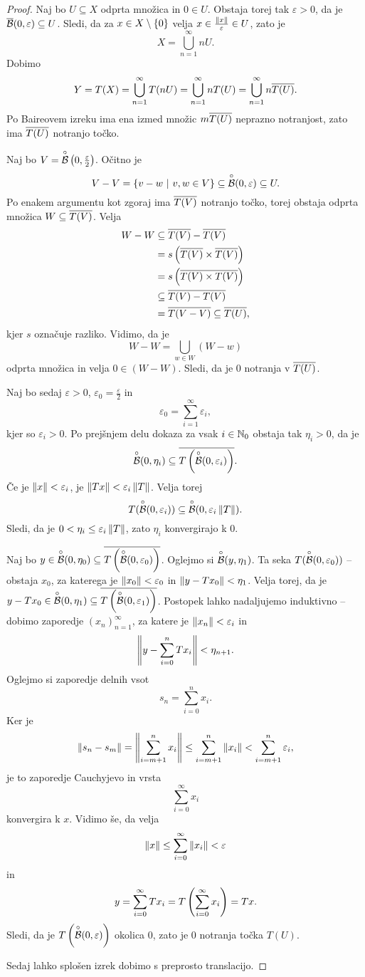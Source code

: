 \begin{proof}
Naj bo $U \subseteq X$ odprta množica in $0 \in U$. Obstaja torej
tak $\varepsilon > 0$, da je
$\overline{\mathcal{B}}(0, \varepsilon) \subseteq U$. Sledi, da za
$x \in X \setminus \left\{0\right\}$ velja
$x \in \frac{\left\lVert x\right\rVert}{\varepsilon} \in U$, zato je
\[
X = \bigcup_{n=1}^\infty nU.
\]
Dobimo
\[
Y = T(X) = \bigcup_{n=1}^\infty T(nU) =
\bigcup_{n=1}^\infty n T(U) = \bigcup_{n=1}^\infty n \overline{T(U)}.
\]
Po Baireovem izreku ima ena izmed množic $m \overline{T(U)}$ neprazno
notranjost, zato ima $\overline{T(U)}$ notranjo točko.

Naj bo $V = \overset{\circ}{\mathcal{B}}\left(0, \frac{\varepsilon}{2}\right)$. Očitno je
\[
V-V = \left\{v-w~\middle\vert~v, w \in V\right\} \subseteq
\overset{\circ}{\mathcal{B}}(0, \varepsilon) \subseteq U.
\]
Po enakem argumentu kot zgoraj ima $\overline{T(V)}$ notranjo točko,
torej obstaja odprta množica $W \subseteq \overline{T(V)}$. Velja
\begin{align*}
W-W &\subseteq \overline{T(V)} - \overline{T(V)}
\\
&= s\left(\overline{T(V)} \times \overline{T(V)}\right)
\\
&= s\left(\overline{T(V) \times T(V)}\right)
\\
&\subseteq \overline{T(V) - T(V)}
\\
&= \overline{T(V-V)} \subseteq \overline{T(U)},
\end{align*}
kjer $s$ označuje razliko. Vidimo, da je
\[
W-W = \bigcup_{w \in W}(W-w)
\]
odprta množica in velja $0 \in (W-W)$. Sledi, da je $0$ notranja v
$\overline{T(U)}$.

Naj bo sedaj $\varepsilon > 0$,
$\varepsilon_0 = \frac{\varepsilon}{2}$ in
\[
\varepsilon_0 = \sum_{i=1}^\infty \varepsilon_i,
\]
kjer so $\varepsilon_i > 0$. Po prejšnjem delu dokaza za vsak
$i \in \mathbb{N}_0$ obstaja tak $\eta_i > 0$, da je
\[
\overset{\circ}{\mathcal{B}}(0, \eta_i) \subseteq \overline{T\left(\overset{\circ}{\mathcal{B}}(0, \varepsilon_i)\right)}.
\]
Če je $\left\lVert x\right\rVert < \varepsilon_i$, je
$\left\lVert Tx\right\rVert < \varepsilon_i \left\lVert T\right\rVert$. Velja torej
\[
T(\overset{\circ}{\mathcal{B}}(0, \varepsilon_i)) \subseteq
\overset{\circ}{\mathcal{B}}(0, \varepsilon_i \left\lVert T\right\rVert).
\]
Sledi, da je $0 < \eta_i \leq \varepsilon_i \left\lVert T\right\rVert$, zato
$\eta_i$ konvergirajo k $0$.

Naj bo $y \in \overset{\circ}{\mathcal{B}}(0, \eta_0) \subseteq
\overline{T\left(\overset{\circ}{\mathcal{B}}(0, \varepsilon_0)\right)}$. Oglejmo si
$\overset{\circ}{\mathcal{B}}(y, \eta_1)$. Ta seka $T(\overset{\circ}{\mathcal{B}}(0, \varepsilon_0))$ -- obstaja
$x_0$, za katerega je $\left\lVert x_0\right\rVert < \varepsilon_0$ in
$\left\lVert y - Tx_0\right\rVert < \eta_1$. Velja torej, da je
$y-Tx_0 \in \overset{\circ}{\mathcal{B}}(0, \eta_1) \subseteq
\overline{T\left(\overset{\circ}{\mathcal{B}}(0, \varepsilon_1)\right)}$. Postopek lahko nadaljujemo
induktivno -- dobimo zaporedje $(x_n)_{n=1}^\infty$, za katere je
$\left\lVert x_n\right\rVert < \varepsilon_i$ in
\[
\left\lVert y - \sum_{i=0}^n Tx_i\right\rVert < \eta_{n+1}.
\]
Oglejmo si zaporedje delnih vsot
\[
s_n = \sum_{i=0}^n x_i.
\]
Ker je
\[
\left\lVert s_n - s_m\right\rVert = \left\lVert \sum_{i=m+1}^n x_i\right\rVert \leq
\sum_{i=m+1}^n \left\lVert x_i\right\rVert < \sum_{i=m+1}^n \varepsilon_i,
\]
je to zaporedje Cauchyjevo in vrsta
\[
\sum_{i=0}^\infty x_i
\]
konvergira k $x$. Vidimo še, da velja
\[
\left\lVert x\right\rVert \leq \sum_{i=0}^\infty \left\lVert x_i\right\rVert < \varepsilon
\]
in
\[
y = \sum_{i=0}^\infty Tx_i = T\left(\sum_{i=0}^\infty x_i\right) = Tx.
\]
Sledi, da je $T\left(\overset{\circ}{\mathcal{B}}(0,\varepsilon)\right)$ okolica $0$, zato je
$0$ notranja točka $T(U)$.

Sedaj lahko splošen izrek dobimo s preprosto translacijo.
\end{proof}

